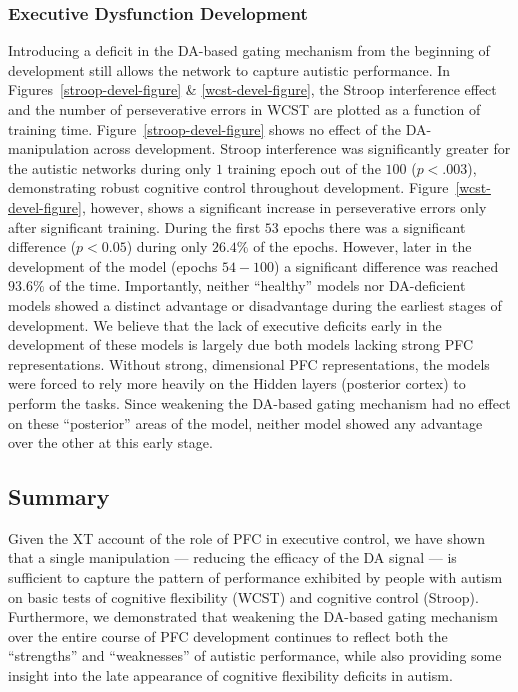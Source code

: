 \subsubsection{Executive Dysfunction Development} 

Introducing a deficit in the DA-based gating mechanism from the
beginning of development still allows the network to capture autistic
performance.  In Figures~\ref{stroop-devel-figure} \& \ref{wcst-devel-figure}, the
Stroop interference effect and the number of perseverative errors in
WCST are plotted as a function of training time.
Figure~\ref{stroop-devel-figure} shows no effect of the
DA-manipulation across development.  Stroop interference was
significantly greater for the autistic networks during only $1$ training epoch
out of the $100$ ($p<.003$), demonstrating robust cognitive control
throughout development.
Figure~\ref{wcst-devel-figure}, however, shows a significant
increase in perseverative errors only after significant training.  During the first $53$
epochs there was a significant difference ($p < 0.05$) during only
$26.4\%$ of the epochs.  However, later in the development of the
model (epochs $54-100$) a significant difference was reached $93.6\%$
of the time.  Importantly, neither ``healthy'' models nor
DA-deficient models showed a distinct advantage or disadvantage during
the earliest stages of development.  We believe that the lack of
executive deficits early in the development of these models is
largely due both models lacking strong PFC
representations.  Without strong, dimensional PFC
representations, the models were forced to rely more heavily on the
Hidden layers (posterior cortex) to perform the tasks.  Since
weakening the DA-based gating mechanism had no effect on these
``posterior'' areas of the model, neither model showed any advantage
over the other at this early stage.

\subsection{Summary}

Given the XT account of the role of PFC in executive control, we have shown that a single manipulation --- reducing the efficacy of the DA signal --- is sufficient to capture the pattern of performance exhibited by people with autism on basic tests of cognitive flexibility (WCST) and cognitive control (Stroop).  Furthermore, we demonstrated that weakening the DA-based gating mechanism over the entire course of PFC development continues to reflect both the ``strengths'' and ``weaknesses'' of autistic performance, while also providing some insight into the late appearance of cognitive flexibility deficits in autism.  

